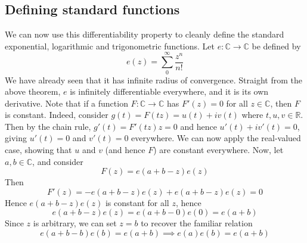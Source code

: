 \subsection{Defining standard functions}
We can now use this differentiability property to cleanly define the standard exponential, logarithmic and trigonometric functions.
Let \(e \colon \mathbb C \to \mathbb C\) be defined by
\[
	e(z) = \sum_0^\infty \frac{z^n}{n!}
\]
We have already seen that it has infinite radius of convergence.
Straight from the above theorem, \(e\) is infinitely differentiable everywhere, and it is its own derivative.
Note that if a function \(F \colon \mathbb C \to \mathbb C\) has \(F'(z) = 0\) for all \(z \in \mathbb C\), then \(F\) is constant.
Indeed, consider \(g(t) = F(tz) = u(t) + iv(t)\) where \(t, u, v \in \mathbb R\).
Then by the chain rule, \(g'(t) = F'(tz)z = 0\) and hence \(u'(t) + iv'(t) = 0\), giving \(u'(t) = 0\) and \(v'(t) = 0\) everywhere.
We can now apply the real-valued case, showing that \(u\) and \(v\) (and hence \(F\)) are constant everywhere.
Now, let \(a, b \in \mathbb C\), and consider
\[
	F(z) = e(a + b - z)e(z)
\]
Then
\[
	F'(z) = -e(a+b-z)e(z) + e(a+b-z)e(z) = 0
\]
Hence \(e(a + b - z)e(z)\) is constant for all \(z\), hence
\[
	e(a + b - z)e(z) = e(a + b - 0)e(0) = e(a + b)
\]
Since \(z\) is arbitrary, we can set \(z=b\) to recover the familiar relation
\[
	e(a+b-b)e(b) = e(a+b) \implies e(a)e(b) = e(a+b)
\]


